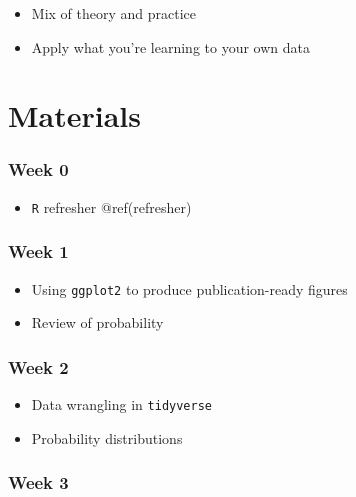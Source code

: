 \documentclass[
  letterpaper,
  DIV=11,
  numbers=noendperiod]{scrreprt}
\providecommand{\tightlist}{%
  \setlength{\itemsep}{0pt}\setlength{\parskip}{0pt}}\usepackage{longtable,booktabs,array}
\begin{document}

\begin{itemize}
\tightlist
\item
  Mix of theory and practice
\item
  Apply what you're learning to your own data
\end{itemize}

\hypertarget{materials}{%
\section*{Materials}\label{materials}}


\hypertarget{week-0}{%
\subsubsection*{Week 0}\label{week-0}}

\begin{itemize}
\tightlist
\item
  \texttt{R} refresher @ref(refresher)
\end{itemize}

\hypertarget{week-1}{%
\subsubsection*{Week 1}\label{week-1}}

\begin{itemize}
\tightlist
\item
  Using \texttt{ggplot2} to produce publication-ready figures
\item
  Review of probability
\end{itemize}

\hypertarget{week-2}{%
\subsubsection*{Week 2}\label{week-2}}

\begin{itemize}
\tightlist
\item
  Data wrangling in \texttt{tidyverse}
\item
  Probability distributions
\end{itemize}

\hypertarget{week-3}{%
\subsubsection*{Week 3}\label{week-3}}
\end{document}
